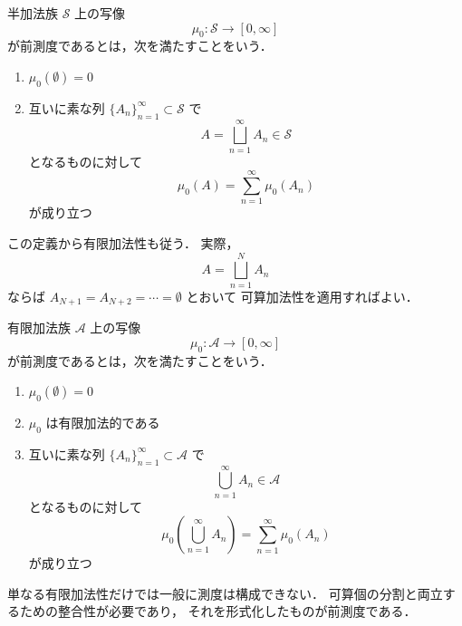 \begin{definition}[半加法族上の前測度]
半加法族 $\mathcal S$ 上の写像
\[
\mu_0:\mathcal S \to [0,\infty]
\]
が前測度であるとは，次を満たすことをいう．
\begin{enumerate}
    \item $\mu_0(\emptyset)=0$
    \item 互いに素な列 $\{A_n\}_{n=1}^{\infty}\subset \mathcal S$ で
    \[
    A=\bigsqcup_{n=1}^{\infty}A_n \in \mathcal S
    \]
    となるものに対して
    \[
    \mu_0(A)=\sum_{n=1}^{\infty}\mu_0(A_n)
    \]
    が成り立つ
\end{enumerate}
\end{definition}

\begin{remark}
この定義から有限加法性も従う．
実際，
\[
A=\bigsqcup_{n=1}^N A_n
\]
ならば $A_{N+1}=A_{N+2}=\cdots=\emptyset$ とおいて
可算加法性を適用すればよい．
\end{remark}

\begin{definition}[前測度]
有限加法族 $\mathcal A$ 上の写像
\[
\mu_0:\mathcal A\to[0,\infty]
\]
が前測度であるとは，次を満たすことをいう．
\begin{enumerate}
    \item $\mu_0(\emptyset)=0$
    \item $\mu_0$ は有限加法的である
    \item 互いに素な列 $\{A_n\}_{n=1}^{\infty}\subset \mathcal A$ で
    \[
    \bigcup_{n=1}^{\infty}A_n\in\mathcal A
    \]
    となるものに対して
    \[
    \mu_0\left(\bigcup_{n=1}^{\infty}A_n\right)
    =
    \sum_{n=1}^{\infty}\mu_0(A_n)
    \]
    が成り立つ
\end{enumerate}
\end{definition}

\begin{remark}
単なる有限加法性だけでは一般に測度は構成できない．
可算個の分割と両立するための整合性が必要であり，
それを形式化したものが前測度である．
\end{remark}

